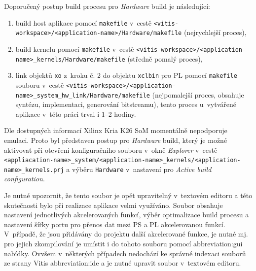 \documentclass[a4paper, twoside, 11pt]{article}
\begin{document}
		\vspace*{0.35cm}
		Doporučený postup build procesu pro \textit{Hardware} build je následující:
		\begin{enumerate}
			\item build host aplikace pomocí \texttt{makefile} v~cestě \texttt{<vitis-workspace>/<application-name>/Hardware/makefile} (nejrychlejší proces),
			\item build kernelu pomocí \texttt{makefile} v~cestě \texttt{<vitis-workspace>/<application-name>\_kernels/Hardware/makefile} (středně pomalý proces),
			\item link objektů \texttt{xo} z~kroku č. 2 do objektu \texttt{xclbin} pro PL pomocí \texttt{makefile} souboru v~cestě \texttt{<vitis-workspace>/<application-name>\_system\_hw\_link/Hardware/makefile} (nejpomalejší proces, obsahuje syntézu, implementaci, generování bitstreamu), tento proces u~vytvářené aplikace v~této práci trval i 1–2 hodiny.
		\end{enumerate}
		\vspace*{0.75cm}
		Dle dostupných informací Xilinx Kria K26 SoM momentálně nepodporuje emulaci. Proto byl představen postup pro \textit{Hardware} build, který je možné aktivovat při otevření konfiguračního souboru v~okně \textit{Explorer} v~cestě \texttt{<appliacation-name>\_system/<application-name>\_kernels/<application-name>\_kernels.prj} a výběru \texttt{Hardware} v~nastavení pro \textit{Active build configuration}.\par
		Je nutné upozornit, že tento soubor je opět upravitelný v~textovém editoru a této skutečnosti bylo při realizace aplikace velmi využíváno. Soubor obsahuje nastavení jednotlivých akcelerovaných funkcí, výběr optimalizace build procesu a nastavení šířky portu pro přenos dat mezi PS a PL akcelerovanou funkcí. V~případě, že jsou přidávány do projektu další akcelerované funkce, je nutné mj. pro jejich zkompilování je umístit i do tohoto souboru pomocí \gls{abbreviation:gui} nabídky. Ovvšem v~některých případech nedochází ke správné indexaci souborů ze strany Vitis \gls{abbreviation:ide} a je nutné upravit soubor v~textovém editoru.\par

		

	
\end{document}
